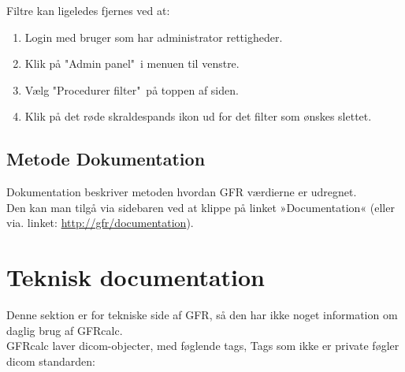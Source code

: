 \documentclass{article}
\begin{document}
Filtre kan ligeledes fjernes ved at:
\begin{enumerate}
	\item Login med bruger som har administrator rettigheder.
	\item Klik på "Admin panel"\ i menuen til venstre.
	\item Vælg "Procedurer filter"\ på toppen af siden.
	\item Klik på det røde skraldespands ikon ud for det filter som ønskes slettet.
\end{enumerate}

\subsection{Metode Dokumentation}\label{Documentation}
Dokumentation beskriver metoden hvordan GFR værdierne er udregnet.\\ 
Den kan man tilgå via sidebaren ved at klippe på linket »Documentation« (eller via. linket: \url{http://gfr/documentation}). 

\section{Teknisk documentation}
Denne sektion er for tekniske side af GFR, så den har ikke noget information om daglig brug af GFRcalc.\\

GFRcalc laver dicom-objecter, med føglende tags, Tags som ikke er private føgler dicom standarden:
\end{document}
